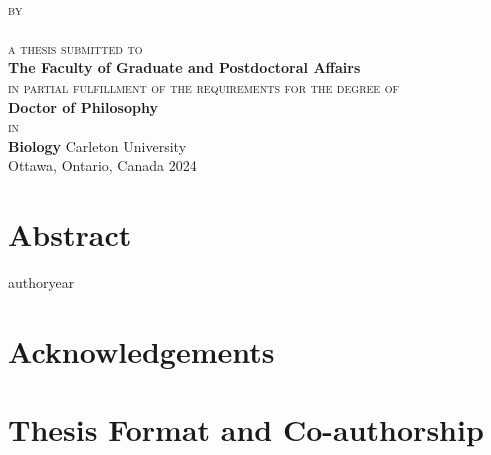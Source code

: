 \begin{titlepage}
  \thispagestyle{empty}
  \centering
  \vspace*{\fill}
  {\LARGE \textbf{\expandafter{\thesistitleI}}}\\[2mm]
  \vfill
  {\scshape by}\\
  {\large \expandafter{\myname}}\\
  \vfill
  {\scshape a thesis submitted to}\\
  \textbf{The Faculty of Graduate and Postdoctoral Affairs}\\
  {\scshape in partial fulfillment of the requirements for the degree of}\\
  \textbf{Doctor of Philosophy}\\
  {\scshape in}\\
  \textbf{Biology}
  \vfill
  {\large Carleton University}\\
  {\large Ottawa, Ontario, Canada}
  \vfill
  {\large \textcopyright{} 2024}\\
  {\large \expandafter{\myname}}
\end{titlepage}

\clearpage

\setcounter{page}{2}

\chapter*{Abstract}


\lipsum[1]


authoryear
\chapter*{Acknowledgements}


\lipsum[2]

\chapter*{Thesis Format and Co-authorship}


\lipsum[2]


\clearpage

\tableofcontents

\listoffigures

\listoftables

\label{endfrontmatter} %
